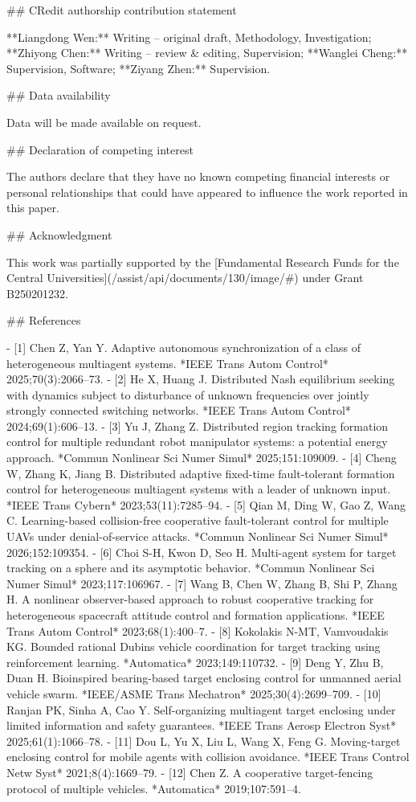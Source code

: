 ## CRedit authorship contribution statement

**Liangdong Wen:** Writing – original draft, Methodology, Investigation; **Zhiyong Chen:** Writing – review & editing, Supervision; **Wanglei Cheng:** Supervision, Software; **Ziyang Zhen:** Supervision.

## Data availability

Data will be made available on request.

## Declaration of competing interest

The authors declare that they have no known competing financial interests or personal relationships that could have appeared to influence the work reported in this paper.

## Acknowledgment

This work was partially supported by the [Fundamental Research Funds for the Central Universities](/assist/api/documents/130/image/#) under Grant B250201232.

## References

- [1] Chen Z, Yan Y. Adaptive autonomous synchronization of a class of heterogeneous multiagent systems. *IEEE Trans Autom Control* 2025;70(3):2066–73.
- [2] He X, Huang J. Distributed Nash equilibrium seeking with dynamics subject to disturbance of unknown frequencies over jointly strongly connected switching networks. *IEEE Trans Autom Control* 2024;69(1):606–13.
- [3] Yu J, Zhang Z. Distributed region tracking formation control for multiple redundant robot manipulator systems: a potential energy approach. *Commun Nonlinear Sci Numer Simul* 2025;151:109009.
- [4] Cheng W, Zhang K, Jiang B. Distributed adaptive fixed-time fault-tolerant formation control for heterogeneous multiagent systems with a leader of unknown input. *IEEE Trans Cybern* 2023;53(11):7285–94.
- [5] Qian M, Ding W, Gao Z, Wang C. Learning-based collision-free cooperative fault-tolerant control for multiple UAVs under denial-of-service attacks. *Commun Nonlinear Sci Numer Simul* 2026;152:109354.
- [6] Choi S-H, Kwon D, Seo H. Multi-agent system for target tracking on a sphere and its asymptotic behavior. *Commun Nonlinear Sci Numer Simul* 2023;117:106967.
- [7] Wang B, Chen W, Zhang B, Shi P, Zhang H. A nonlinear observer-based approach to robust cooperative tracking for heterogeneous spacecraft attitude control and formation applications. *IEEE Trans Autom Control* 2023;68(1):400–7.
- [8] Kokolakis N-MT, Vamvoudakis KG. Bounded rational Dubins vehicle coordination for target tracking using reinforcement learning. *Automatica* 2023;149:110732.
- [9] Deng Y, Zhu B, Duan H. Bioinspired bearing-based target enclosing control for unmanned aerial vehicle swarm. *IEEE/ASME Trans Mechatron* 2025;30(4):2699–709.
- [10] Ranjan PK, Sinha A, Cao Y. Self-organizing multiagent target enclosing under limited information and safety guarantees. *IEEE Trans Aerosp Electron Syst* 2025;61(1):1066–78.
- [11] Dou L, Yu X, Liu L, Wang X, Feng G. Moving-target enclosing control for mobile agents with collision avoidance. *IEEE Trans Control Netw Syst* 2021;8(4):1669–79.
- [12] Chen Z. A cooperative target-fencing protocol of multiple vehicles. *Automatica* 2019;107:591–4.

